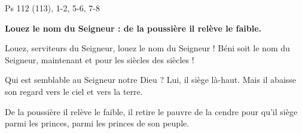 Ps 112 (113), 1-2, 5-6, 7-8

\textbf{Louez le nom du Seigneur :
de la poussière il relève le faible.}

\smallskip

Louez, serviteurs du Seigneur,
louez le nom du Seigneur !
Béni soit le nom du Seigneur,
maintenant et pour les siècles des siècles !

\smallskip

Qui est semblable au Seigneur notre Dieu ?
Lui, il siège là-haut.
Mais il abaisse son regard
vers le ciel et vers la terre.

\smallskip

De la poussière il relève le faible,
il retire le pauvre de la cendre
pour qu’il siège parmi les princes,
parmi les princes de son peuple.

